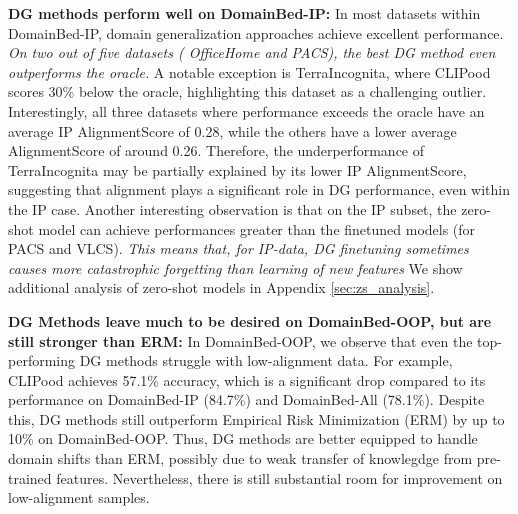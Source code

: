 \documentclass{article} %
\begin{document}
\textbf{DG methods perform well on DomainBed-IP:} In most datasets within DomainBed-IP, domain generalization approaches achieve excellent performance. \emph{On two out of five datasets ( OfficeHome and PACS), the best DG method even outperforms the oracle.} A notable exception is TerraIncognita, where CLIPood scores 30\% below the oracle, highlighting this dataset as a challenging outlier. Interestingly, all three datasets where performance exceeds the oracle have an average IP AlignmentScore of 0.28, while the others have a lower average AlignmentScore of around 0.26. Therefore, the underperformance of TerraIncognita may be partially explained by its lower IP AlignmentScore, suggesting that alignment plays a significant role in DG performance, even within the IP case.  Another interesting observation is that on the IP subset, the zero-shot model can achieve performances greater than the finetuned models (for PACS and VLCS).  \emph{This means that, for IP-data, DG finetuning sometimes causes more catastrophic forgetting than learning of new features} We show additional analysis of zero-shot models in Appendix \ref{sec:zs_analysis}. 




\textbf{DG Methods leave much to be desired on DomainBed-OOP, but are still stronger than ERM:} In DomainBed-OOP, we observe that even the top-performing DG methods struggle with low-alignment data. For example, CLIPood achieves 57.1\% accuracy, which is a significant drop compared to its performance on DomainBed-IP (84.7\%) and DomainBed-All (78.1\%). Despite this, DG methods still outperform Empirical Risk Minimization (ERM) by up to 10\% on DomainBed-OOP. Thus, DG methods are better equipped to handle domain shifts than ERM, possibly due to weak transfer of knowlegdge from pre-trained features. Nevertheless, there is still substantial room for improvement on low-alignment samples.
\end{document}
